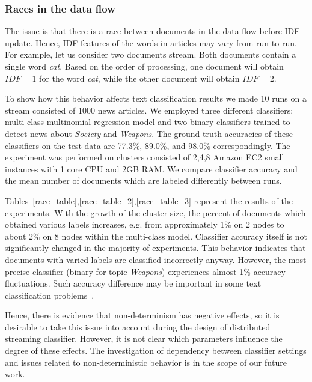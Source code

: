 \subsubsection{Races in the data flow}
The issue is that there is a race between documents in the data flow before IDF update. Hence, IDF features of the words in articles may vary from run to run. For example, let us consider two documents stream. Both documents contain a single word {\em cat}. Based on the order of processing, one document will obtain $IDF=1$ for the word {\em cat}, while the other document will obtain $IDF=2$.

To show how this behavior affects text classification results we made 10 runs on a stream consisted of 1000 news articles. We employed three different classifiers: multi-class multinomial regression model and two binary classifiers trained to detect news about {\em Society} and {\em Weapons}. The ground truth accuracies of these classifiers on the test data are 77.3\%, 89.0\%, and 98.0\% correspondingly. The experiment was performed on clusters consisted of 2,4,8 Amazon EC2 small instances with 1 core CPU and 2GB RAM. We compare classifier accuracy and the mean number of documents which are labeled differently between runs.

Tables~\ref{race_table},\ref{race_table_2},\ref{race_table_3} represent the results of the experiments. With the growth of the cluster size, the percent of documents which obtained various labels increases, e.g. from approximately 1\% on 2 nodes to about 2\% on 8 nodes within the multi-class model. Classifier accuracy itself is not significantly changed in the majority of experiments. This behavior indicates that documents with varied labels are classified incorrectly anyway. However, the most precise classifier (binary for topic {\em Weapons}) experiences almost 1\% accuracy fluctuations. Such accuracy difference may be important in some text classification problems~\cite{Kuralenok:2018:CEV:3269206.3271789}.


Hence, there is evidence that non-determinism has negative effects, so it is desirable to take this issue into account during the design of distributed streaming classifier. However, it is not clear which parameters influence the degree of these effects. The investigation of dependency between classifier settings and issues related to non-deterministic behavior is in the scope of our future work.

